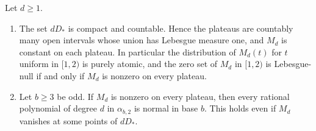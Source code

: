 \documentclass[11pt]{article}
\begin{document}
\begin{proposition}\label{plateaus}
Let \(d\ge1\).
\begin{enumerate}
\item The set \(dD_*\) is compact and countable. Hence the plateaus are
countably many open intervals whose union has Lebesgue measure one, and
\(M_d\) is constant on each plateau. In particular the distribution of
\(M_d(t)\) for \(t\) uniform in \([1,2)\) is purely atomic, and the zero
set of \(M_d\) in \([1,2)\) is Lebesgue-null if and only if \(M_d\) is
nonzero on every plateau.
\item Let \(b\ge3\) be odd. If \(M_d\) is nonzero on every plateau, then
every rational polynomial of degree \(d\) in \(\alpha_{b,2}\) is normal in
base \(b\). This holds even if \(M_d\) vanishes at some points of
\(dD_*\).
\end{enumerate}
\end{proposition}
\end{document}
